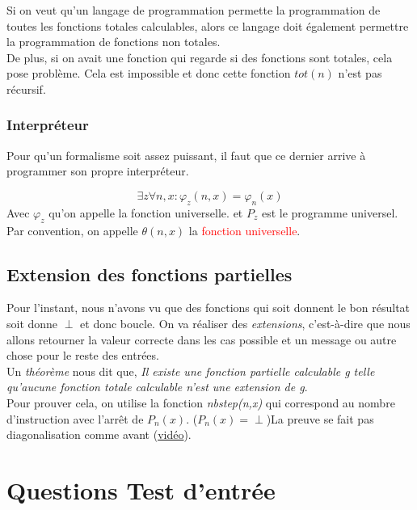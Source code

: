 \documentclass{report}
\begin{document}
Si on veut qu’un langage de programmation permette la programmation de toutes les fonctions totales calculables, alors ce langage doit également permettre
la programmation de fonctions non totales.\\

De plus, si on avait une fonction qui regarde si des fonctions sont totales, cela pose problème. Cela est impossible et donc cette fonction $tot(n)$ n'est pas récursif.

\subsection{Interpréteur}
Pour qu'un formalisme soit assez puissant, il faut que ce dernier arrive à programmer son propre interpréteur.

\begin{equation}
\exists z \forall n,x : \varphi_z(n,x) = \varphi_n(x)
\end{equation}
Avec $\varphi_z$ qu'on appelle la fonction universelle. et $P_z$ est le programme universel. Par convention, on appelle $\theta(n,x)$ la \textcolor{red}{fonction universelle}.

\section{Extension des fonctions partielles}
Pour l'instant, nous n'avons vu que des fonctions qui soit donnent le bon résultat soit donne $\perp$ et donc boucle. On va réaliser des \textit{extensions}, c'est-à-dire que nous allons retourner la valeur correcte dans les cas possible et un message ou autre chose pour le reste des entrées.\\

Un \textit{théorème} nous dit que, \textit{Il existe une fonction partielle calculable g telle qu’aucune fonction totale calculable n’est une extension de g}.\\
Pour prouver cela, on utilise la fonction \textit{nbstep(n,x)} qui correspond au nombre d'instruction avec l'arrêt de $P_n(x)$. ($P_n(x) = \perp$)La preuve se fait pas diagonalisation comme avant (\href{http://ezcast.uclouvain.be/ezplayer/index.php?action=view_asset_bookmark&album=LINFO1123-pub&asset=2021_02_17_21h51_34s&t=224&type=cam&token=EVKUMNQV}{vidéo}).\\



\chapter{Questions Test d'entrée}
\end{document}
